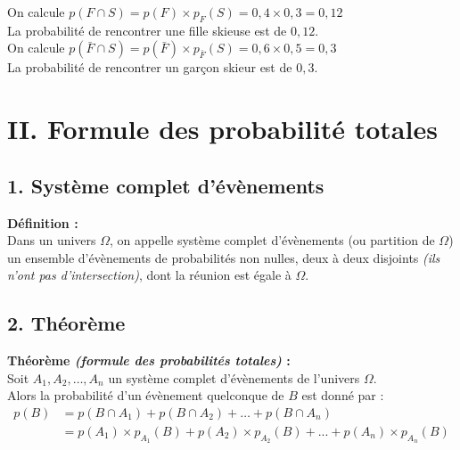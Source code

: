 \documentclass[11pt,a4paper]{article}
\begin{document}
On calcule $p(F\cap S)=p(F)\times p_F(S)=0,4\times0,3=0,12$ \\
La probabilité de rencontrer une fille skieuse est de $0,12$. \\

On calcule $p(\bar F\cap S)=p(\bar F)\times p_{\bar{F}}(S)=0,6\times0,5=0,3$ \\
La probabilité de rencontrer un garçon skieur est de $0,3$.

\section*{II. Formule des probabilité totales}

\subsection*{1. Système complet d'évènements}

\begin{mdframed}[style=definitionStyle]
  \textbf{Définition :} ~\\
  Dans un univers $\Omega$, on appelle système complet d'évènements (ou partition de $\Omega$) un ensemble d'évènements de probabilités non nulles, deux à deux disjoints \emph{(ils n'ont pas d'intersection)}, dont la réunion est égale à $\Omega$.
\end{mdframed}

\subsection*{2. Théorème}

\begin{mdframed}[style=proprieteStyle]
  \textbf{Théorème \emph{(formule des probabilités totales)} :} ~\\
  Soit $A_1,A_2,\dots,A_n$ un système complet d'évènements de l'univers $\Omega$. \\
  Alors la probabilité d'un évènement quelconque de $B$ est donné par :
  \vspace{-8pt}
  \begin{equation*}
    \begin{split}
      p(B)&=p(B\cap A_1)+p(B\cap A_2)+\dots+p(B\cap A_n)\\
      &= p(A_1)\times p_{A_1}(B)+p(A_2)\times p_{A_2}(B)+...+p(A_n)\times p_{A_n}(B)
    \end{split}
  \end{equation*}
\end{mdframed}
\end{document}
